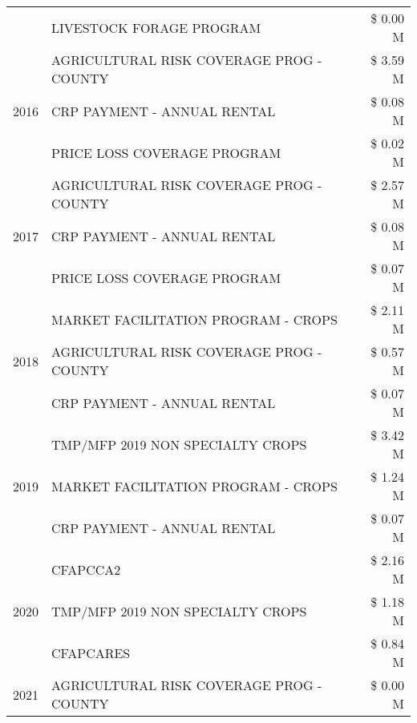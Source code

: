 \begin{tabular}{llr}
 & LIVESTOCK FORAGE PROGRAM & \$ 0.00 M \\
\cline{1-3}
\multirow[t]{3}{*}{2016} & AGRICULTURAL RISK COVERAGE PROG - COUNTY      & \$ 3.59 M \\
 & CRP PAYMENT - ANNUAL RENTAL                   & \$ 0.08 M \\
 & PRICE LOSS COVERAGE PROGRAM                   & \$ 0.02 M \\
\cline{1-3}
\multirow[t]{3}{*}{2017} & AGRICULTURAL RISK COVERAGE PROG - COUNTY & \$ 2.57 M \\
 & CRP PAYMENT - ANNUAL RENTAL & \$ 0.08 M \\
 & PRICE LOSS COVERAGE PROGRAM & \$ 0.07 M \\
\cline{1-3}
\multirow[t]{3}{*}{2018} & MARKET FACILITATION PROGRAM - CROPS & \$ 2.11 M \\
 & AGRICULTURAL RISK COVERAGE PROG - COUNTY & \$ 0.57 M \\
 & CRP PAYMENT - ANNUAL RENTAL & \$ 0.07 M \\
\cline{1-3}
\multirow[t]{3}{*}{2019} & TMP/MFP 2019 NON SPECIALTY CROPS & \$ 3.42 M \\
 & MARKET FACILITATION PROGRAM - CROPS & \$ 1.24 M \\
 & CRP PAYMENT - ANNUAL RENTAL & \$ 0.07 M \\
\cline{1-3}
\multirow[t]{3}{*}{2020} & CFAPCCA2 & \$ 2.16 M \\
 & TMP/MFP 2019 NON SPECIALTY CROPS & \$ 1.18 M \\
 & CFAPCARES & \$ 0.84 M \\
\cline{1-3}
2021 & AGRICULTURAL RISK COVERAGE PROG - COUNTY & \$ 0.00 M \\
\cline{1-3}
\bottomrule
\end{tabular}
